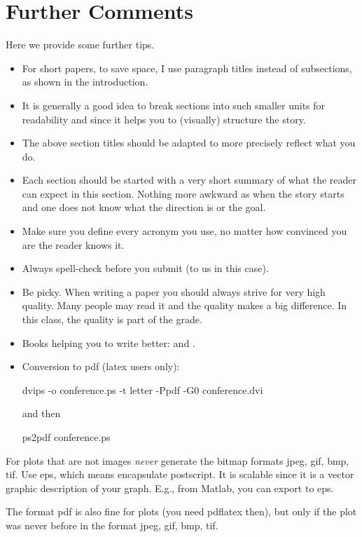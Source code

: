 \section{Further Comments}
  \label{sec:further_comments}

  Here we provide some further tips.


  \begin{itemize}
    \item For short papers, to save space, I use paragraph titles instead of
      subsections, as shown in the introduction.

    \item It is generally a good idea to break sections into such smaller
      units for readability and since it helps you to (visually) structure the story.

    \item The above section titles should be adapted to more precisely
      reflect what you do.

    \item Each section should be started with a very
      short summary of what the reader can expect in this section. Nothing
      more awkward as when the story starts and one does not know what the
      direction is or the goal.

    \item Make sure you define every acronym you use, no matter how
      convinced you are the reader knows it.

    \item Always spell-check before you submit (to us in this case).

    \item Be picky. When writing a paper you should always strive for very
      high quality. Many people may read it and the quality makes a big difference.
      In this class, the quality is part of the grade.

    \item Books helping you to write better: \cite{Higham:98} and \cite{Strunk:00}.

    \item Conversion to pdf (latex users only): 

      dvips -o conference.ps -t letter -Ppdf -G0 conference.dvi

      and then

      ps2pdf conference.ps
    \end{itemize}

     For plots that are not images {\em never} generate the bitmap formats
    jpeg, gif, bmp, tif. Use eps, which means encapsulate postscript. It is
    scalable since it is a vector graphic description of your graph. E.g.,
    from Matlab, you can export to eps.

    The format pdf is also fine for plots (you need pdflatex then), but only if the plot was never before in the format 
    jpeg, gif, bmp, tif.



